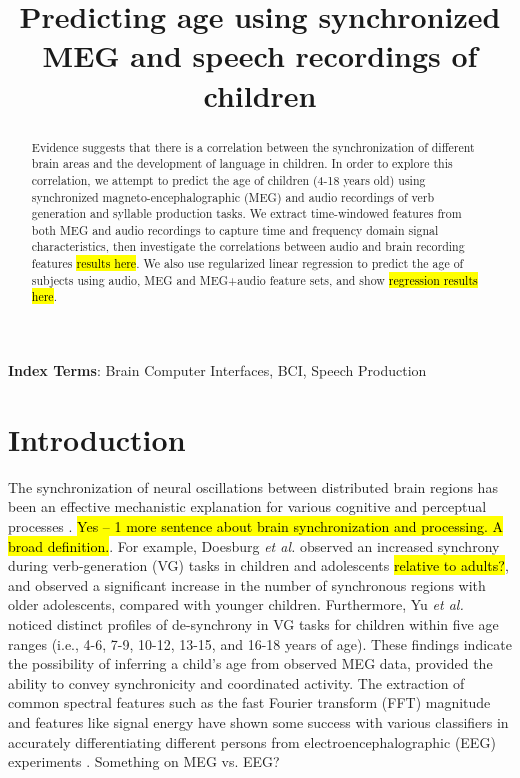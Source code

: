 \documentclass[a4paper]{article}
\title{Predicting age using synchronized MEG and speech recordings of children}
\newcommand{\FR}[1]{{\small \textcolor{red}{\hl{#1}}}}
\begin{document}
\maketitle
% 
\begin{abstract}
Evidence suggests that there is a correlation between the synchronization of different brain areas and the development of language in children. In order to explore this correlation, we attempt to predict the age of children (4-18 years old) using synchronized magneto-encephalographic (MEG) and audio recordings of verb generation and syllable production tasks. We extract time-windowed features from both MEG and audio recordings to capture time and frequency domain signal characteristics, then investigate the correlations between audio and brain recording features \FR{results here}. We also use regularized linear regression to predict the age of subjects using audio, MEG and MEG+audio feature sets, and show \FR{regression results here}. 
\end{abstract}


\noindent\textbf{Index Terms}: Brain Computer Interfaces, BCI, Speech Production

\section{Introduction}

The synchronization of neural oscillations between distributed brain regions has been an effective mechanistic explanation for various cognitive and perceptual processes \cite{Fries2015,Nakasaki1989,NeuralSync}. \FR{Yes -- 1 more sentence about brain synchronization and processing. A broad definition.}. For example, Doesburg {\em et al.} \cite{Doesburg2016} observed an increased synchrony during verb-generation (VG) tasks in children and adolescents \FR{relative to adults?}, and observed a significant increase in the number of synchronous regions with older adolescents, compared with younger children. Furthermore, Yu {\em et al.} \cite{Yu2014} noticed distinct profiles of de-synchrony in VG tasks for children within five age ranges (i.e., 4-6, 7-9, 10-12, 13-15, and 16-18 years of age). These findings indicate the possibility of inferring a child's age from observed MEG data, provided the ability to convey synchronicity and coordinated activity. The extraction of common spectral features such as the fast Fourier transform (FFT) magnitude and features like signal energy have shown some success with various classifiers in accurately differentiating different persons from electroencephalographic (EEG) experiments \cite{Nguyen2012} \cite{Poulos2001}. Something on MEG vs. EEG?
\end{document}
